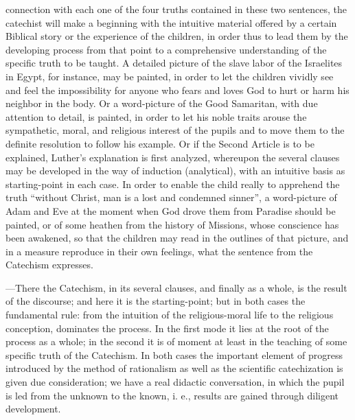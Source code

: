 connection with each one of the four truths contained in these two sentences, the catechist will make a beginning with the intuitive material offered by a certain Biblical story or the experience of the children, in order thus to lead them by the developing process from that point to a comprehensive understanding of the specific truth to be taught. A detailed picture of the slave labor of the Israelites in Egypt, for instance, may be painted, in order to let the children vividly see and feel the impossibility for anyone who fears and loves God to hurt or harm his neighbor in the body. Or a word-picture of the Good Samaritan, with due attention to detail, is painted, in order to let his noble traits arouse the sympathetic, moral, and religious interest of the pupils and to move them to the definite resolution to follow his example. Or if the Second Article is to be explained, Luther’s explanation is first analyzed, whereupon the several clauses may be developed in the way of induction (analytical), with an intuitive basis as starting-point in each case. In order to enable the child really to apprehend the truth “without Christ, man is a lost and condemned sinner”, a word-picture of Adam and Eve at the moment when God drove them from Paradise should be painted, or of some heathen from the history of Missions, whose conscience has been awakened, so that the children may read in the outlines of that picture, and in a measure reproduce in their own feelings, what the sentence from the Catechism expresses.

—There the Catechism, in its several clauses, and finally as a whole, is the result of the discourse; and here it is the starting-point; but in both cases the fundamental rule: from the intuition of the religious-moral life to the religious conception, dominates the process. In the first mode it lies at the root of the process as a whole; in the second it is of moment at least in the teaching of some specific truth of the Catechism. In both cases the important element of progress
introduced by the method of rationalism as well as the scientific catechization is given due consideration; we have a real didactic conversation, in which the pupil is led from the unknown to the known, i. e., results are gained through diligent development.

